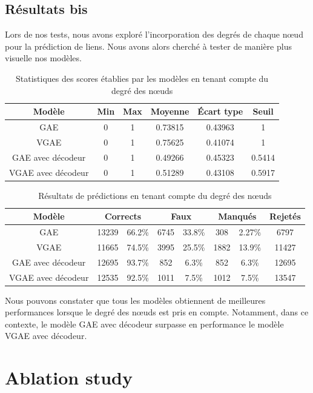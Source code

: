 \documentclass{article}
\begin{document}
\subsection{Résultats bis}
Lors de nos tests, nous avons exploré l'incorporation des degrés de chaque nœud pour la prédiction de liens. Nous avons alors cherché à tester de manière plus visuelle nos modèles.

\begin{table}[H]
    \centering
    \begin{tabular}{|c|c|c|c|c|c|}
        \hline
        Modèle & Min & Max & Moyenne & Écart type & Seuil\\
        \hline
        GAE & 0 & 1 & 0.73815 & 0.43963 & 1\\
        VGAE & 0 & 1 & 0.75625 & 0.41074 & 1\\
        GAE avec décodeur & 0 & 1 & 0.49266 & 0.45323 & 0.5414\\
        VGAE avec décodeur & 0 & 1 & 0.51289 & 0.43108 & 0.5917\\
        \hline
    \end{tabular}
    \caption{Statistiques des scores établies par les modèles en tenant compte du degré des nœuds}
    \label{tab:statistiques_scores_avec_degre}
\end{table}

\begin{table}[H]
    \centering
    \begin{tabular}{|c|c|c|c|c|c|c|c|}
        \hline
        Modèle & \multicolumn{2}{c|}{Corrects} & \multicolumn{2}{c|}{Faux} & \multicolumn{2}{c|}{Manqués} & Rejetés\\
        \hline
        GAE & 13239 & 66.2\% & 6745 & 33.8\% & 308 & 2.27\% & 6797\\
        VGAE & 11665 & 74.5\% & 3995 & 25.5\% & 1882 & 13.9\% & 11427\\
        GAE avec décodeur & 12695 & 93.7\% & 852 & 6.3\% & 852 & 6.3\% & 12695\\
        VGAE avec décodeur & 12535 & 92.5\% & 1011 & 7.5\% & 1012 & 7.5\% & 13547\\
         \hline
    \end{tabular}
    \caption{Résultats de prédictions en tenant compte du degré des nœuds}
    \label{tab:resultats_reconstruction_avec_degre}
\end{table}

Nous pouvons constater que tous les modèles obtiennent de meilleures performances lorsque le degré des nœuds est pris en compte. Notamment, dans ce contexte, le modèle GAE avec décodeur surpasse en performance le modèle VGAE avec décodeur.



\section{Ablation study}
\end{document}
